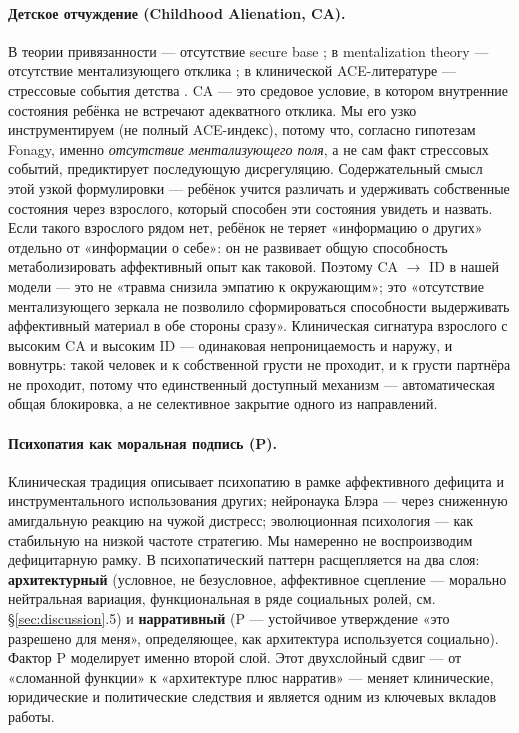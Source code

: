 \paragraph{Детское отчуждение (Childhood Alienation, CA).}
В теории привязанности --- отсутствие secure base \citep{bowlby1969, ainsworth1978}; в mentalization theory --- отсутствие ментализующего отклика \citep{fonagy2002}; в клинической ACE-литературе --- стрессовые события детства \citep{felitti1998}. CA --- это средовое условие, в котором внутренние состояния ребёнка не встречают адекватного отклика. Мы его узко инструментируем (не полный ACE-индекс), потому что, согласно гипотезам Fonagy, именно \emph{отсутствие ментализующего поля}, а не сам факт стрессовых событий, предиктирует последующую дисрегуляцию. Содержательный смысл этой узкой формулировки --- ребёнок учится различать и удерживать собственные состояния через взрослого, который способен эти состояния увидеть и назвать. Если такого взрослого рядом нет, ребёнок не теряет «информацию о других» отдельно от «информации о себе»: он не развивает общую способность метаболизировать аффективный опыт как таковой. Поэтому CA $\to$ ID в нашей модели --- это не «травма снизила эмпатию к окружающим»; это «отсутствие ментализующего зеркала не позволило сформироваться способности выдерживать аффективный материал в обе стороны сразу». Клиническая сигнатура взрослого с высоким CA и высоким ID --- одинаковая непроницаемость и наружу, и вовнутрь: такой человек и к собственной грусти не проходит, и к грусти партнёра не проходит, потому что единственный доступный механизм --- автоматическая общая блокировка, а не селективное закрытие одного из направлений.

\paragraph{Психопатия как моральная подпись (P).}
Клиническая традиция \citep{cleckley1941, hare1991} описывает психопатию в рамке аффективного дефицита и инструментального использования других; нейронаука Блэра \citep{blair1995, blair2013} --- через сниженную амигдальную реакцию на чужой дистресс; эволюционная психология \citep{mealey1995, lalumiere2001} --- как стабильную на низкой частоте стратегию. Мы намеренно не воспроизводим дефицитарную рамку. В \DEIC{} психопатический паттерн расщепляется на два слоя: \textbf{архитектурный} (условное, не безусловное, аффективное сцепление --- морально нейтральная вариация, функциональная в ряде социальных ролей, см. §\ref{sec:discussion}.5) и \textbf{нарративный} (P --- устойчивое утверждение «это разрешено для меня», определяющее, как архитектура используется социально). Фактор P моделирует именно второй слой. Этот двухслойный сдвиг --- от «сломанной функции» к «архитектуре плюс нарратив» --- меняет клинические, юридические и политические следствия и является одним из ключевых вкладов работы.

